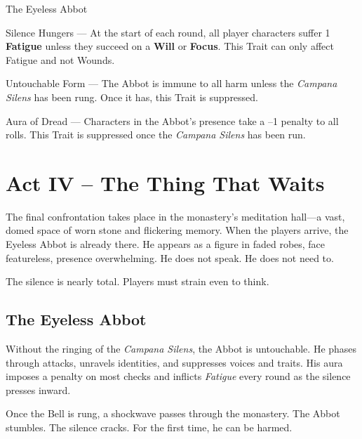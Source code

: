 \documentclass[nodeprecatedcode,bg=print]{dndbook/dndbook}
\begin{document}
\begin{WyrdFullNPC}[%
    name=The Eyeless Abbot,%
    description=Silence Incarnate,%
    float=!t%
  ]{The Eyeless Abbot}
  \vspace{0.5\baselineskip}
  \SkillsBox[%
    expert={Will},%
    skilled={Focus, Insight},%
    novice={Fight, Awareness}%
  ]
  
  \begin{TraitsBox}
    \item[Silence Hungers] — At the start of each round, all player characters suffer 1 \textbf{Fatigue} unless they succeed on a \Challenging \textbf{Will} or \textbf{Focus}. This Trait can only affect Fatigue and not Wounds.
    \item[Untouchable Form] — The Abbot is immune to all harm unless the \emph{Campana Silens} has been rung. Once it has, this Trait is suppressed.
    \item[Aura of Dread] — Characters in the Abbot’s presence take a –1 penalty to all rolls. This Trait is suppressed once the \emph{Campana Silens} has been run.
  \end{TraitsBox}

  \DamageBox[%
    totalfatigue=3,%
    totalmild=2,%
    totalmoderate=1,%
    totalsevere=0,%
  ]

\end{WyrdFullNPC}


\section*{Act IV – The Thing That Waits}

The final confrontation takes place in the monastery’s meditation hall—a vast, domed space of worn stone and flickering memory. When the players arrive, the Eyeless Abbot is already there. He appears as a figure in faded robes, face featureless, presence overwhelming. He does not speak. He does not need to.

The silence is nearly total. Players must strain even to think.

\subsection{The Eyeless Abbot}

Without the ringing of the \emph{Campana Silens}, the Abbot is untouchable. He phases through attacks, unravels identities, and suppresses voices and traits. His aura imposes a penalty on most checks and inflicts \emph{Fatigue} every round as the silence presses inward.

Once the Bell is rung, a shockwave passes through the monastery. The Abbot stumbles. The silence cracks. For the first time, he can be harmed.
\end{document}
